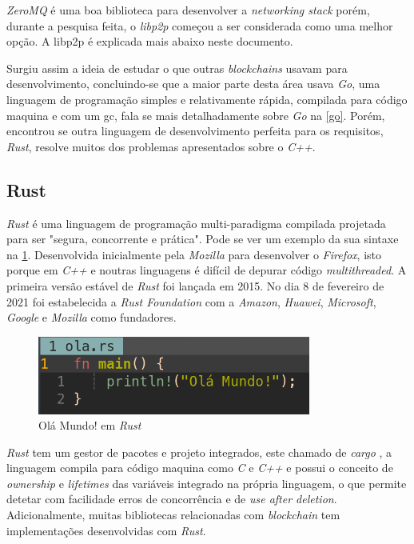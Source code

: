 \textit{ZeroMQ} é uma boa biblioteca para desenvolver a \textit{networking stack} porém, durante a pesquisa feita, o \textit{libp2p} começou a ser considerada como uma melhor opção. A libp2p é explicada mais abaixo neste documento.

Surgiu assim a ideia de estudar o que outras \textit{blockchains} usavam para desenvolvimento, concluindo-se que a maior parte desta área usava \textit{Go}, uma linguagem de programação simples e relativamente rápida, compilada para código maquina e com um \gls{gc}, fala se mais detalhadamente sobre \textit{Go} na \cref{go}. Porém, encontrou se outra linguagem de desenvolvimento perfeita para os requisitos, \textit{Rust}, resolve muitos dos problemas apresentados sobre o  \textit{C++}.

\subsection{Rust}
\label{subsection:rust}

\textit{Rust} é uma linguagem de programação multi-paradigma compilada projetada para ser "segura, concorrente e prática".
Pode se ver um exemplo da sua sintaxe na \cref{fig:rust-ola}. 
Desenvolvida inicialmente pela \textit{Mozilla} para desenvolver o \textit{Firefox}, isto porque em \textit{C++} e noutras linguagens é difícil de depurar código \textit{multithreaded}. A primeira versão estável de \textit{Rust} foi lançada em 2015. No dia 8 de fevereiro de 2021 foi estabelecida a \textit{Rust Foundation} com a \textit{Amazon}, \textit{Huawei}, \textit{Microsoft}, \textit{Google} e \textit{Mozilla} como fundadores. \cite{rust_wiki}

\begin{figure}[H]
    \centering
    \includegraphics[width=0.8\textwidth]{images/rust-ola.png}
    \caption{Olá Mundo! em \textit{Rust}}
    \label{fig:rust-ola}
\end{figure}

\textit{Rust} tem um gestor de pacotes e projeto integrados, este chamado de \textit{cargo} \cite{cargo_book}, a linguagem compila para código maquina como \textit{C} e \textit{C++} e possui o conceito de \textit{ownership} e \textit{lifetimes} das variáveis integrado na própria linguagem, o que permite detetar com facilidade erros de concorrência e  de \textit{use after deletion}. Adicionalmente, muitas bibliotecas relacionadas com \textit{blockchain} tem implementações desenvolvidas com \textit{Rust}.

